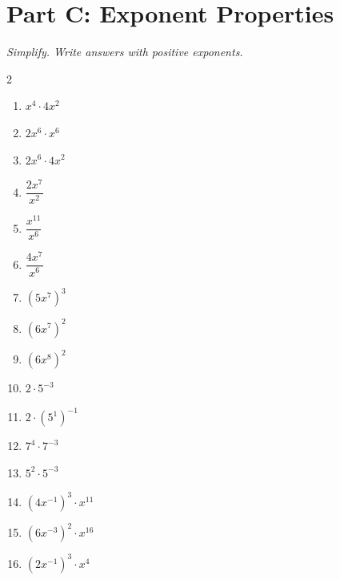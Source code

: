 \documentclass[11pt]{article}
\begin{document}
\section*{Part C: Exponent Properties}
\noindent\textit{Simplify. Write answers with positive exponents.}
\begin{multicols}{2}
\begin{enumerate}
  \item $x^{4} \cdot 4x^{2}$
  \vspace{1.3cm}
  \item $2x^{6} \cdot x^{6}$
  \vspace{1.3cm}
  \item $2x^{6} \cdot 4x^{2}$
  \vspace{1.3cm}
  \item $\dfrac{2x^{7}}{x^{2}}$
  \vspace{1.3cm}
  \item $\dfrac{x^{11}}{x^{6}}$
  \vspace{1.3cm}
  \item $\dfrac{4x^{7}}{x^{6}}$
  \vspace{1.3cm}
  \item $(5x^{7})^{3}$
  \vspace{1.3cm}
  \item $(6x^{7})^{2}$
  \vspace{1.3cm}
  \item $(6x^{8})^{2}$
  \vspace{1.3cm}
  \item $2 \cdot 5^{-3}$
  \vspace{1.3cm}
  \item $2 \cdot (5^{1})^{-1}$
  \vspace{1.3cm}
  \item $7^{4} \cdot 7^{-3}$
  \vspace{1.3cm}
  \item $5^{2} \cdot 5^{-3}$
  \vspace{1.3cm}
  \item $(4x^{-1})^{3} \cdot x^{11}$
  \vspace{1.3cm}
  \item $(6x^{-3})^{2} \cdot x^{16}$
  \vspace{1.3cm}
  \item $(2x^{-1})^{3} \cdot x^{4}$
  \vspace{1.3cm}
\end{enumerate}
\end{multicols}
\end{document}
